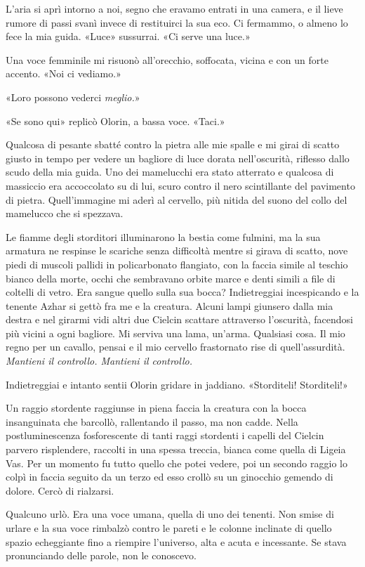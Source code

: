 L'aria si aprì intorno a noi, segno che eravamo entrati in una camera, e
il lieve rumore di passi svanì invece di restituirci la sua eco. Ci
fermammo, o almeno lo fece la mia guida. «Luce» sussurrai. «Ci serve una
luce.»

Una voce femminile mi risuonò all'orecchio, soffocata, vicina e con un
forte accento. «Noi ci vediamo.»

«Loro possono vederci \emph{meglio.}»

«Se sono qui» replicò Olorin, a bassa voce. «Taci.»

Qualcosa di pesante sbatté contro la pietra alle mie spalle e mi girai
di scatto giusto in tempo per vedere un bagliore di luce dorata
nell'oscurità, riflesso dallo scudo della mia guida. Uno dei mamelucchi
era stato atterrato e qualcosa di massiccio era accoccolato su di lui,
scuro contro il nero scintillante del pavimento di pietra.
Quell'immagine mi aderì al cervello, più nitida del suono del collo del
mamelucco che si spezzava.

Le fiamme degli storditori illuminarono la bestia come fulmini, ma la
sua armatura ne respinse le scariche senza difficoltà mentre si girava
di scatto, nove piedi di muscoli pallidi in policarbonato flangiato, con
la faccia simile al teschio bianco della morte, occhi che sembravano
orbite marce e denti simili a file di coltelli di vetro. Era sangue
quello sulla sua bocca? Indietreggiai incespicando e la tenente Azhar si
gettò fra me e la creatura. Alcuni lampi giunsero dalla mia destra e nel
girarmi vidi altri due Cielcin scattare attraverso l'oscurità, facendosi
più vicini a ogni bagliore. Mi serviva una lama, un'arma. Qualsiasi
cosa. Il mio regno per un cavallo, pensai e il mio cervello frastornato
rise di quell'assurdità. \emph{Mantieni il controllo. Mantieni il
	controllo.}

Indietreggiai e intanto sentii Olorin gridare in jaddiano. «Storditeli!
Storditeli!»

Un raggio stordente raggiunse in piena faccia la creatura con la bocca
insanguinata che barcollò, rallentando il passo, ma non cadde. Nella
postluminescenza fosforescente di tanti raggi stordenti i capelli del
Cielcin parvero risplendere, raccolti in una spessa treccia, bianca come
quella di Ligeia Vas. Per un momento fu tutto quello che potei vedere,
poi un secondo raggio lo colpì in faccia seguito da un terzo ed esso
crollò su un ginocchio gemendo di dolore. Cercò di rialzarsi.

Qualcuno urlò. Era una voce umana, quella di uno dei tenenti. Non smise
di urlare e la sua voce rimbalzò contro le pareti e le colonne inclinate
di quello spazio echeggiante fino a riempire l'universo, alta e acuta e
incessante. Se stava pronunciando delle parole, non le conoscevo.

